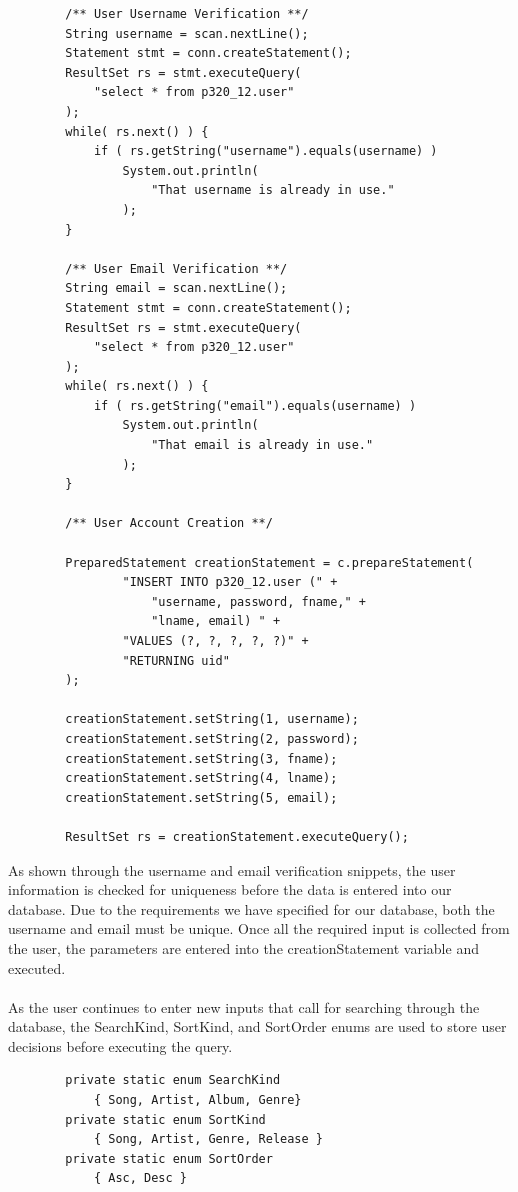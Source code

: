 \documentclass[12pt]{article}
\begin{document}
    \begin{lstlisting}
        /** User Username Verification **/
        String username = scan.nextLine();
        Statement stmt = conn.createStatement();
        ResultSet rs = stmt.executeQuery(
            "select * from p320_12.user"
        );
        while( rs.next() ) {
            if ( rs.getString("username").equals(username) )
                System.out.println(
                    "That username is already in use."
                );
        }

        /** User Email Verification **/
        String email = scan.nextLine();
        Statement stmt = conn.createStatement();
        ResultSet rs = stmt.executeQuery(
            "select * from p320_12.user"
        );
        while( rs.next() ) {
            if ( rs.getString("email").equals(username) )
                System.out.println(
                    "That email is already in use."
                );
        }

        /** User Account Creation **/

        PreparedStatement creationStatement = c.prepareStatement(
                "INSERT INTO p320_12.user (" +
                    "username, password, fname," +
                    "lname, email) " +
                "VALUES (?, ?, ?, ?, ?)" +
                "RETURNING uid"
        );

		creationStatement.setString(1, username);
		creationStatement.setString(2, password);
		creationStatement.setString(3, fname);
		creationStatement.setString(4, lname);
		creationStatement.setString(5, email);

        ResultSet rs = creationStatement.executeQuery();
    \end{lstlisting}
    As shown through the username and email verification snippets,
    the user information is checked for uniqueness before the data
    is entered into our database. Due to the requirements we have
    specified for our database, both the username and email must be
    unique. Once all the required input is collected from the user,
    the parameters are entered into the creationStatement variable and
    executed.
    \\~\\
    As the user continues to enter new inputs that call for searching
    through the database, the SearchKind, SortKind, and SortOrder enums
    are used to store user decisions before executing the query.
    \begin{lstlisting}
        private static enum SearchKind
            { Song, Artist, Album, Genre}
        private static enum SortKind
            { Song, Artist, Genre, Release }
        private static enum SortOrder
            { Asc, Desc }
    \end{lstlisting}
\end{document}
